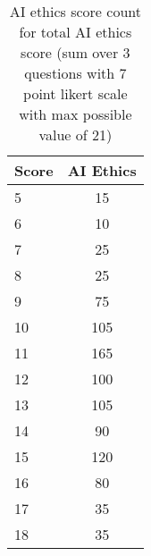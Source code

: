 \begin{table}[h]
\centering
\small
\begin{tabular}{lc}
\hline
Score & AI Ethics \\ \hline
5  & 15             \\
6  & 10             \\
7  & 25             \\
8  & 25             \\
9  & 75             \\
10 & 105            \\
11 & 165            \\
12 & 100            \\
13 & 105            \\
14 & 90             \\
15 & 120            \\
16 & 80             \\
17 & 35             \\
18 & 35             \\ \hline
\end{tabular}
\caption{AI ethics score count for total AI ethics score (sum over 3 questions with 7 point likert scale with max possible value of 21)}
\label{tab:ai-ethics-distr}
\end{table}